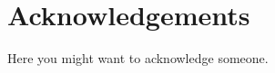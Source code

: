 \documentclass{Configuration_Files/PoliMi3i_thesis}
\begin{document}
\chapter*{Acknowledgements}
Here you might want to acknowledge someone.

\cleardoublepage
\end{document}
